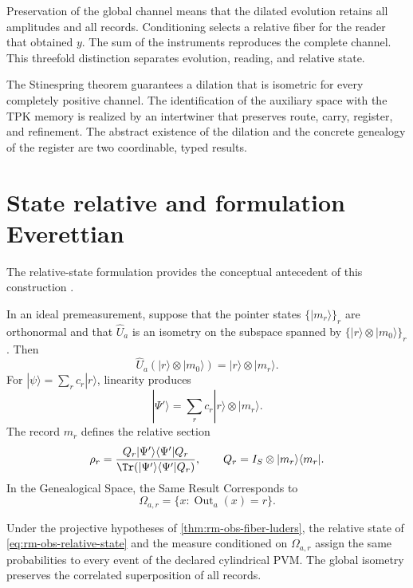 Preservation of the global channel means that the dilated evolution
retains all amplitudes and all records. Conditioning
selects a relative fiber for the reader that obtained \(y\). The sum of
the instruments reproduces the complete channel. This threefold distinction
separates evolution, reading, and relative state.

The Stinespring theorem \cite{Stinespring1955} guarantees a dilation that is isometric for every
completely positive channel. The identification of the auxiliary space with
the TPK memory is realized by an intertwiner that preserves route,
carry, register, and refinement. The abstract existence of the dilation
and the concrete genealogy of the register are two coordinable, typed results.

\section{State relative and formulation Everettian}

The relative-state formulation provides the conceptual antecedent
of this construction \cite{Everett1957}.

In an ideal premeasurement, suppose that the pointer states
\(\{|m_r\rangle\}_r\) are orthonormal and that \(\widehat U_a\) is an
isometry on the subspace spanned by
\(\{|r\rangle\otimes|m_0\rangle\}_r\). Then
\begin{equation}
 \widehat U_a(|r\rangle\otimes|m_0\rangle)
 =|r\rangle\otimes|m_r\rangle.
 \label{eq:rm-obs-ideal-premeasurement}
\end{equation}
For \(|\psi\rangle=\sum_r c_r|r\rangle\), linearity produces
\begin{equation}
 |\Psi'\rangle
 =\sum_r c_r|r\rangle\otimes|m_r\rangle.
 \label{eq:rm-obs-entangled-record}
\end{equation}
The record \(m_r\) defines the relative section
\begin{equation}
 \rho_r
 =\frac{Q_r|\Psi'\rangle\langle\Psi'|Q_r}
 {\Tr(|\Psi'\rangle\langle\Psi'|Q_r)},
 \qquad
 Q_r=I_S\otimes|m_r\rangle\langle m_r|.
 \label{eq:rm-obs-relative-state}
\end{equation}
In the Genealogical Space, the Same Result Corresponds to
\begin{equation}
 \Omega_{a,r}
 =\{x:\operatorname{Out}_a(x)=r\}.
 \label{eq:rm-obs-relative-fiber}
\end{equation}

\begin{theorem}
\label{thm:rm-obs-everett-correspondence}
Under the projective hypotheses of
\cref{thm:rm-obs-fiber-luders}, the relative state of
\cref{eq:rm-obs-relative-state} and the measure conditioned on
\(\Omega_{a,r}\) assign the same probabilities to every event of
the declared cylindrical PVM. The global isometry preserves the correlated superposition
of all records.
\end{theorem}

